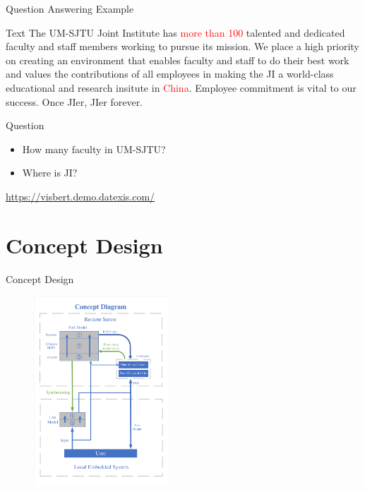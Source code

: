 \documentclass[12pt]{beamer}
\begin{document}
\begin{frame}{Question Answering Example}
    \begin{block}{Text}
        The UM-SJTU Joint Institute has \textcolor{red}{more than 100} talented and dedicated faculty and staff members working to pursue its mission. We place a high priority on creating an environment that enables faculty and staff to do their best work and values the contributions of all employees in making the JI a world-class educational and research insitute in \textcolor{red}{China}. Employee commitment is vital to our success. Once JIer, JIer forever.
    \end{block}
    \begin{block}{Question}
        \begin{itemize}
            \item How many faculty in UM-SJTU?
            \item Where is JI?
        \end{itemize}
    \end{block}
    \url{https://visbert.demo.datexis.com/}
\end{frame}

\section{Concept Design}
\begin{frame}{Concept Design}
\begin{figure}[H]
    \centering
    \includegraphics[width=0.45\textwidth]{Concept_Design.pdf}
\end{figure}
\end{frame}
\end{document}
